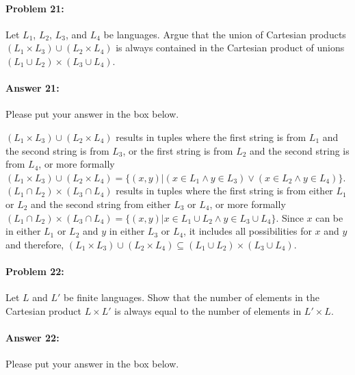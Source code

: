 \documentclass[10pt]{article}
\newenvironment{AnswerBox}{\begin{mdframed}[style=simple]}{\end{mdframed}}
\begin{document}
\noindent\hrulefill %

\paragraph{Problem 21:}
Let $L_1$, $L_2$, $L_3$, and $L_4$ be languages. Argue that the union of
Cartesian products $(L_1 \times L_3) \cup (L_2 \times L_4)$ is always contained
in the Cartesian product of unions $(L_1 \cup L_2) \times (L_3 \cup L_4)$.

\paragraph{Answer 21:} Please put your answer in the box below.

\begin{AnswerBox}%

  $(L_1 \times L_3) \cup (L_2 \times L_4)$ results in tuples where the first string is from $L_1$ and the second string is from $L_3$, or the first string is from $L_2$ and the second string is from $L_4$, or more formally $(L_1 \times L_3) \cup (L_2 \times L_4) = \{(x, y) | (x \in L_1 \land y \in L_3) \lor (x \in L_2 \land y \in L_4)\}$. $(L_1 \cap L_2) \times (L_3 \cap L_4)$ results in tuples where the first string is from either $L_1$ or $L_2$ and the second string from either $L_3$ or $L_4$, or more formally $(L_1 \cap L_2) \times (L_3 \cap L_4) = \{(x, y) | x \in L_1 \cup L_2 \land y \in L_3 \cup L_4\}$.  Since $x$ can be in either $L_1$ or $L_2$ and $y$ in either $L_3$ or $L_4$, it includes all possibilities for $x$ and $y$  and therefore, $(L_1 \times L_3) \cup (L_2 \times L_4) \subseteq (L_1 \cup L_2) \times (L_3 \cup L_4)$.

\end{AnswerBox}%

\noindent\hrulefill %

\paragraph{Problem 22:}
Let $L$ and $L'$ be finite languages. Show that the number of elements in the
Cartesian product $L \times L'$ is always equal to the number of elements in $L'
\times L$.

\paragraph{Answer 22:} Please put your answer in the box below.
\end{document}
